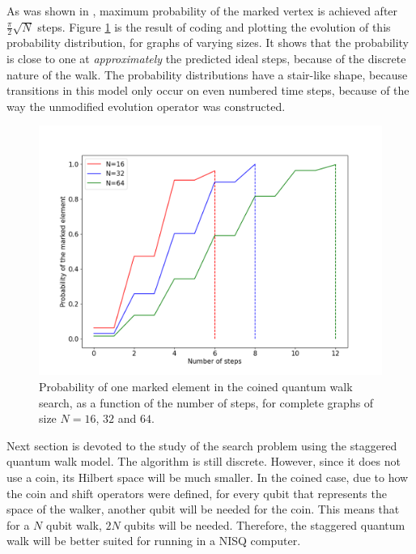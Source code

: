 \documentclass[../../dissertation.tex]{subfiles}
\begin{document}
As was shown in \cite{REN1}, maximum probability of the marked vertex is
achieved after $\frac{\pi}{2}\sqrt{N}$ steps. Figure \ref{fig:coinedSearch} is
the result of coding and plotting the evolution of this probability
distribution, for graphs of varying sizes. It shows that the probability is
close to one at \textit{approximately} the predicted ideal steps, because of
the discrete nature of the walk. The probability distributions have a
stair-like shape, because transitions in this model only occur on even numbered
time steps, because of the way the unmodified evolution
operator was constructed.
\begin{figure}[!h]
	\centering
	\includegraphics[scale=0.40]{img/CoinedQuantumWalk/Search/CoinedSearch163264.png}
	\caption{Probability of one marked element in the coined quantum walk search, as a function of the number of steps, for complete graphs of size $N=16$, $32$ and $64$.}\label{fig:coinedSearch}
\end{figure}\par
Next section is devoted to the study of the search problem using the
staggered quantum walk model. The algorithm is still discrete. However, since it
does not use a coin, its Hilbert space will be much smaller. In the coined
case, due to how the coin and shift operators were defined, for every qubit
that represents the space of the walker, another qubit will be needed for the
coin. This means that for a $N$ qubit walk, $2N$ qubits will be needed.
Therefore, the staggered quantum walk will be better suited for running in a
NISQ computer.
\end{document}
